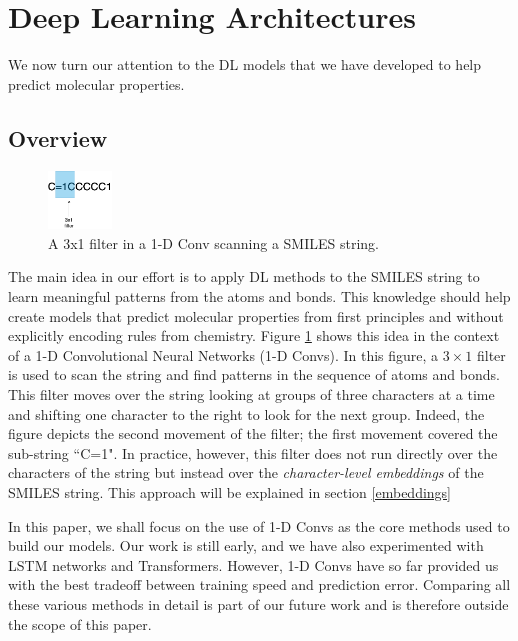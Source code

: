 \section{Deep Learning Architectures \label{archi}}
We now turn our attention to the DL models that we have developed to help predict molecular properties.
\subsection{Overview}
    \begin{figure}[htbp]
        \centering
        \includegraphics[width=0.15\textwidth]{figures/convonsmiles.png}
        \caption{A 3x1 filter in a 1-D Conv scanning a SMILES string. }
        \label{fig:conv-filter}
    \end{figure}
The main idea in our effort is to apply DL methods to the SMILES string to learn meaningful patterns from the atoms and bonds. This knowledge should help create models that predict molecular properties from first principles and without explicitly encoding rules from chemistry. Figure \ref{fig:conv-filter} shows this idea in the context of a 1-D Convolutional Neural Networks (1-D Convs). In this figure, a $3 \times 1$ filter is used to scan the string and find patterns in the sequence of atoms and bonds. This filter moves over the string looking at groups of three characters at a time and shifting one character to the right to look for the next group. Indeed, the figure depicts the second movement of the filter; the first movement covered the sub-string ``C=1".  In practice, however, this filter does not run directly over the characters of the string but instead  over the {\em character-level embeddings}  of the SMILES string. This approach will be explained in section \ref{embeddings}


In this paper, we shall focus on the use of 1-D Convs as the core methods used to build our models. Our work is still early, and we have also experimented with LSTM networks and Transformers. However,  1-D Convs have so far provided us with the best tradeoff between training speed and prediction error. Comparing all these various methods in detail is part of our future work and is therefore outside the scope of this paper. 


